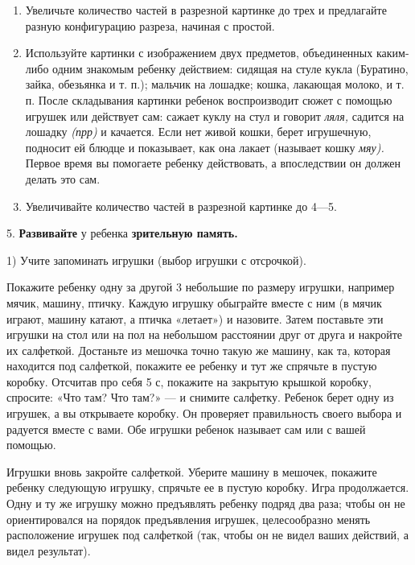 \documentclass[a5paper]{book}
\renewcommand{\emph}[1]{\textit{#1}}
\begin{document}
\begin{enumerate}
\def\labelenumi{\arabic{enumi})}
\setcounter{enumi}{3}
\item
  
  Увеличьте количество частей в разрезной картинке до трех и предлагайте
  разную конфигурацию разреза, начиная с простой.
  
\item
  
  Используйте картинки с изображением двух предметов, объединенных
  каким-либо одним знакомым ребенку действием: сидящая на стуле кукла
  (Буратино, зайка, обезьянка и т. п.); мальчик на лошадке; кошка,
  лакающая молоко, и т. п. После складывания картинки ребенок
  воспроизводит сюжет с помощью игрушек или действует сам: сажает куклу
  на стул и говорит \emph{ляля,} садится на лошадку \emph{(прр)} и
  качается. Если нет живой кошки, берет игрушечную, подносит ей блюдце и
  показывает, как она лакает (называет кошку \emph{мяу).} Первое время
  вы помогаете ребенку действовать, а впоследствии он должен делать это
  сам.
  
\item
  
  Увеличивайте количество частей в разрезной картинке до 4---5.
  
\end{enumerate}


5. \textbf{Развивайте} у ребенка \textbf{зрительную память.}

1) Учите запоминать игрушки (выбор игрушки с отсрочкой).

Покажите ребенку одну за другой 3 небольшие по размеру игрушки, например
мячик, машину, птичку. Каждую игрушку обыграйте вместе с ним (в мячик
играют, машину катают, а птичка «летает») и назовите. Затем поставьте
эти игрушки на стол или на пол на небольшом расстоянии друг от друга и
накройте их салфеткой. Достаньте из мешочка точно такую же машину, как
та, которая находится под салфеткой, покажите ее ребенку и тут же
спрячьте в пустую коробку. Отсчитав про себя 5 с, покажите на закрытую
крышкой коробку, спросите: «Что там? Что там?» --- и снимите салфетку.
Ребенок берет одну из игрушек, а вы открываете коробку. Он проверяет
правильность своего выбора и радуется вместе с вами. Обе игрушки ребенок
называет сам или с вашей помощью.

Игрушки вновь закройте салфеткой. Уберите машину в мешочек, покажите
ребенку следующую игрушку, спрячьте ее в пустую коробку. Игра
продолжается. Одну и ту же игрушку можно предъявлять ребенку подряд два
раза; чтобы он не ориентировался на порядок предъявления игрушек,
целесообразно менять расположение игрушек под салфеткой (так, чтобы он
не видел ваших действий, а видел результат).
\end{document}

